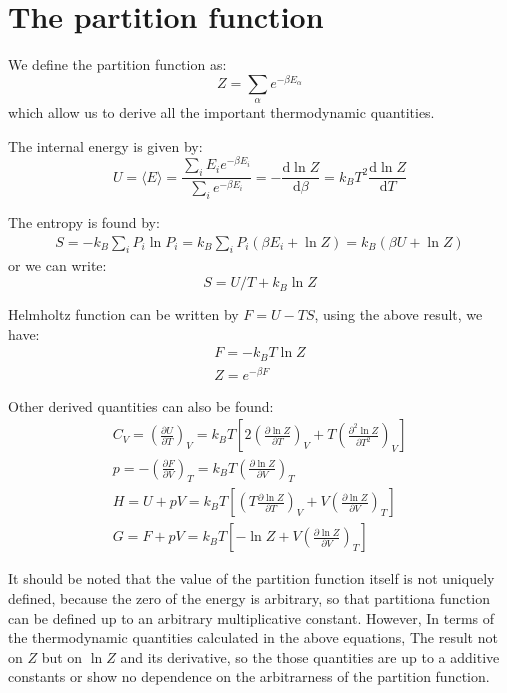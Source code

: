 \documentclass{article}
\newcommand{\pfrac}[2]{\frac{\partial #1}{\partial #2}}
\newcommand{\dnor}{\text{d}}
\begin{document}
\section{The partition function}
We define the partition function as:
\begin{equation}
    Z = \sum_{\alpha} e^{-\beta E_{\alpha}}
\end{equation}
which allow us to derive all the important thermodynamic quantities. 

The internal energy is given by:
\begin{equation}
    U = \langle E \rangle = \frac{\sum_{i} E_i e^{-\beta E_i}}{\sum_{i} e^{-\beta E_i}} = -\frac{\dnor \ln Z}{\dnor\beta} = k_BT^2\frac{\dnor \ln Z}{\dnor T}
\end{equation}

The entropy is found by:
\begin{align}
    S = -k_B \sum_i P_i \ln P_i = k_B \sum_i P_i (\beta E_i + \ln Z) = k_B (\beta U + \ln Z)
\end{align}
or we can write:
\begin{equation}
    S = U/T + k_B \ln Z
\end{equation}

Helmholtz function can be written by $F = U - TS$, using the above result, we have:
\begin{gather}
    F = -k_B T \ln Z \\
    Z = e^{-\beta F}
\end{gather}

Other derived quantities can also be found:
\begin{gather}
    C_V = \left(\pfrac{U}{T}\right)_V = k_B T \left[ 2\left(\pfrac{\ln Z}{T}\right)_V + T \left( \frac{\partial^2\ln Z}{\partial T^2} \right)_V \right] \\
    p = - \left(\pfrac{F}{V}\right)_T = k_B T \left( \pfrac{\ln Z}{V} \right)_T \\
    H = U + pV =  k_B T \left[ \left( T\pfrac{\ln Z}{T}\right)_V + V \left( \pfrac{\ln Z}{V} \right)_T \right] \\
    G = F + pV =  k_B T \left[ -\ln Z + V \left( \pfrac{\ln Z}{V} \right)_T \right]
\end{gather}

It should be noted that the value of the partition function itself
is not uniquely defined, because the zero of the energy is arbitrary,
so that partitiona function can be defined up to an arbitrary multiplicative constant.
However, In terms of the thermodynamic quantities calculated in the above equations,
The result not on $Z$ but on $\ln Z$ and its derivative, so the 
those quantities are up to a additive constants or show no dependence on the 
arbitrarness of the partition function.
\end{document}

